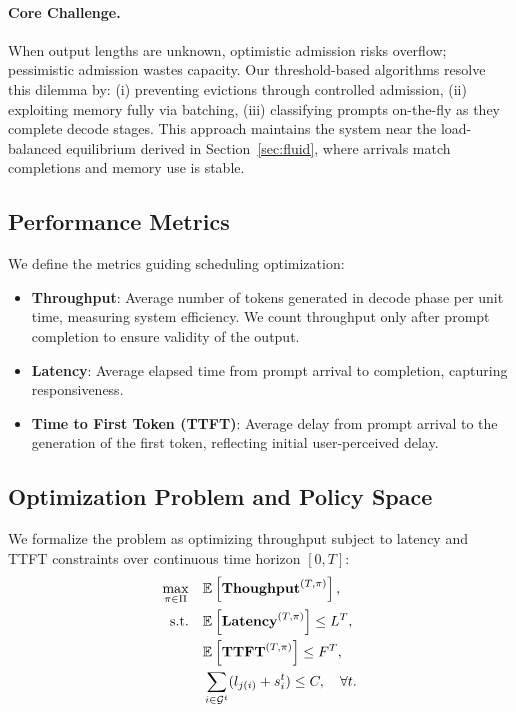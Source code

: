\paragraph{Core Challenge.}
When output lengths are unknown, optimistic admission risks overflow; pessimistic admission wastes capacity. Our threshold-based algorithms resolve this dilemma by: (i) preventing evictions through controlled admission, (ii) exploiting memory fully via batching, (iii) classifying prompts on-the-fly as they complete decode stages. This approach maintains the system near the load-balanced equilibrium derived in Section~\ref{sec:fluid}, where arrivals match completions and memory use is stable.

\subsection{Performance Metrics}

We define the metrics guiding scheduling optimization:
\begin{itemize}
    \item \textbf{Throughput}: Average number of tokens generated in decode phase per unit time, measuring system efficiency. We count throughput only after prompt completion to ensure validity of the output.
    \item \textbf{Latency}: Average elapsed time from prompt arrival to completion, capturing responsiveness.
    \item \textbf{Time to First Token (TTFT)}: Average delay from prompt arrival to the generation of the first token, reflecting initial user-perceived delay.
\end{itemize}

\subsection{Optimization Problem and Policy Space}
We formalize the problem as optimizing throughput subject to latency and TTFT constraints over continuous time horizon $[0,T]$:
\begin{equation}
\label{eq:optimization}
    \begin{aligned}
            \max_{\pi \in \Pi} \quad &\mathbb{E}_{}\left[\textbf{Thoughput}^{(T,\pi)}\right], \\
    \text{s.t.}\quad & \mathbb{E}_{}\left[\textbf{Latency}^{(T,\pi)}\right] \le L^T,\\
    & \mathbb{E}_{}\left[\textbf{TTFT}^{(T,\pi)}\right] \le F^T, \\
    & \sum_{i \in \mathcal{G}^t} (l_{j(i)} + s^t_i) \le C, \quad \forall t.
    \end{aligned}
\end{equation}

